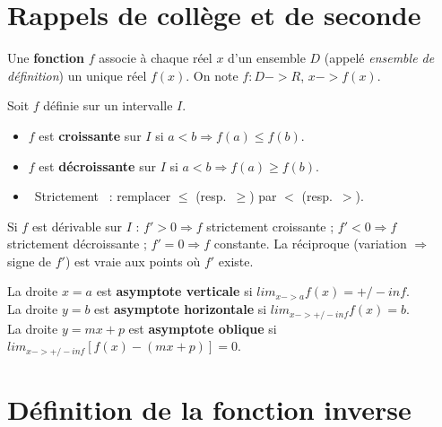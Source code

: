 \documentclass[10pt,a4paper]{article}
\def\to{->}\def\mapsto{->}\def\infty{inf}\def\pm{+/-}%
\def\mathbb#1{#1}\def\lim{lim}\def\cup{U}\def\not{}%
\begin{document}
	\section{Rappels de collège et de seconde}
	
	\begin{rappel}[title={\ding{45}~\textbf{RAPPEL}~\textbullet~D\'efinition d'une fonction}]
		Une \textbf{fonction} $f$ associe \`a chaque r\'eel $x$ d'un ensemble $D$ (appel\'e \emph{ensemble de d\'efinition}) un unique r\'eel $f(x)$. On note $f:D\to\mathbb{R}$, $x\mapsto f(x)$.
	\end{rappel}
	
	\begin{rappel}[title={\ding{45}~\textbf{RAPPEL}~\textbullet~Sens de variation}]
		Soit $f$ d\'efinie sur un intervalle $I$.
		\begin{itemize}[leftmargin=*,itemsep=1pt]
			\item $f$ est \textbf{croissante} sur $I$ si $a<b \Rightarrow f(a)\le f(b)$.
			\item $f$ est \textbf{d\'ecroissante} sur $I$ si $a<b \Rightarrow f(a)\ge f(b)$.
			\item \guillemotleft~Strictement~\guillemotright{} : remplacer $\le$ (resp.\ $\ge$) par $<$ (resp.\ $>$).
		\end{itemize}
	\end{rappel}
	
	\begin{acomprendre}[title={\ding{110}~\textbf{\`A COMPRENDRE}~\textbullet~Lien d\'eriv\'ee / variations}]
		Si $f$ est d\'erivable sur $I$ : $f'>0 \Rightarrow f$ strictement croissante ; $f'<0 \Rightarrow f$ strictement d\'ecroissante ; $f'=0 \Rightarrow f$ constante. La r\'eciproque (variation $\Rightarrow$ signe de $f'$) est vraie aux points o\`u $f'$ existe.
	\end{acomprendre}
	
	\begin{rappel}[title={\ding{45}~\textbf{RAPPEL}~\textbullet~Asymptotes}]
		La droite $x=a$ est \textbf{asymptote verticale} si $\lim_{x\to a} f(x)=\pm\infty$.\\
		La droite $y=b$ est \textbf{asymptote horizontale} si $\lim_{x\to\pm\infty} f(x)=b$.\\
		La droite $y=mx+p$ est \textbf{asymptote oblique} si $\lim_{x\to\pm\infty}[f(x)-(mx+p)]=0$.
	\end{rappel}
	
	\section{D\'efinition de la fonction inverse}
	
\end{document}
